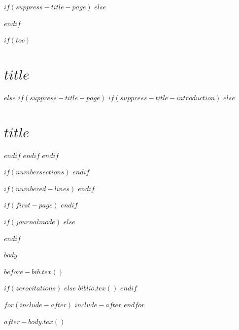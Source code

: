 $if(suppress-title-page)$
$else$
\maketitle
$endif$


$if(toc)$
\hypertarget{toc}{}
\tableofcontents
\newpage
\section[Introduction]{$title$}
$else$
$if(suppress-title-page)$
$if(suppress-title-introduction)$
$else$
\section[Introduction]{$title$}
$endif$
$endif$
$endif$

$if(numbersections)$
\setcounter{secnumdepth}{$if(number-depth)$$number-depth$$else$3$endif$}
$endif$

\setlength\LTleft{0pt}

$if(numbered-lines)$
\resetlinenumber[1]
$endif$

$if(first-page)$
\setcounter{page}{$first-page$}
$endif$

\ifdefined\Shaded\renewenvironment{Shaded}{\begin{snugshade}\begin{singlespace}}{\end{singlespace}\end{snugshade}}\fi

$if(journalmode)$
$else$

\ifdefined\cslhangindent\else\newlength{\cslhangindent}\fi
\ifdefined\csllabelwidth\else\newlength{\csllabelwidth}\fi
\setlength{\cslhangindent}{0.5in}

$endif$

$body$

$before-bib.tex()$

$if(zerocitations)$
$else$
$biblio.tex()$
$endif$

$for(include-after)$
$include-after$
$endfor$

$after-body.tex()$


